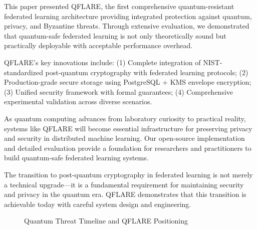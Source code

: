 \documentclass[conference]{IEEEtran}
\begin{document}
This paper presented QFLARE, the first comprehensive quantum-resistant federated learning architecture providing integrated protection against quantum, privacy, and Byzantine threats. Through extensive evaluation, we demonstrated that quantum-safe federated learning is not only theoretically sound but practically deployable with acceptable performance overhead.

QFLARE's key innovations include: (1) Complete integration of NIST-standardized post-quantum cryptography with federated learning protocols; (2) Production-grade secure storage using PostgreSQL + KMS envelope encryption; (3) Unified security framework with formal guarantees; (4) Comprehensive experimental validation across diverse scenarios.

As quantum computing advances from laboratory curiosity to practical reality, systems like QFLARE will become essential infrastructure for preserving privacy and security in distributed machine learning. Our open-source implementation and detailed evaluation provide a foundation for researchers and practitioners to build quantum-safe federated learning systems.

The transition to post-quantum cryptography in federated learning is not merely a technical upgrade—it is a fundamental requirement for maintaining security and privacy in the quantum era. QFLARE demonstrates that this transition is achievable today with careful system design and engineering.

\begin{figure}[htbp]
\centering
{}
\caption{Quantum Threat Timeline and QFLARE Positioning}
\label{fig:quantum_timeline}
\end{figure}
\end{document}
